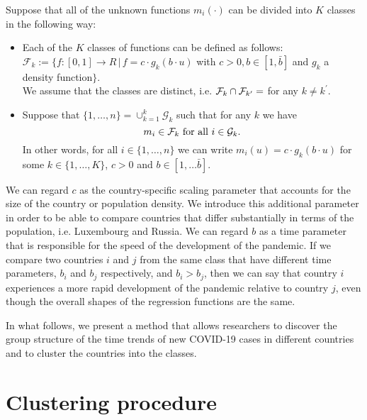 \documentclass[a4paper,11pt]{article}
\numberwithin{equation}{section}
\begin{document}
Suppose that all of the unknown functions $m_i(\cdot)$ can be divided into $K$ classes in the following way:
\begin{itemize}
	\item Each of the $K$ classes of functions can be defined as follows:\\
	 $\mathcal{F}_k := \{ f:[0, 1] \rightarrow R \,|\, f = c \cdot g_k(b \cdot u)$ with $c>0, b\in [1, \bar{b}]$ and $g_k$ a density function$\}$.\\
	 We assume that the classes are distinct, i.e. $\class_k \cap \class_{k^\prime} = \empty$ for any $k \neq k^\prime$. 
	 \item Suppose that $\{1, \ldots, n\} = \cup_{k=1}^k \mathcal{G}_k$ such that for any $k$ we have $$m_i \in \mathcal{F}_k \text{ for all } i \in \mathcal{G}_k.$$
	In other words, for all $i \in \{1, \ldots, n\}$ we can write $m_i(u) = c \cdot g_k (b \cdot u)$ for some $k \in \{1, \ldots, K\}$, $c > 0 $ and $b \in [1, \ldots \bar{b}]$.
\end{itemize} 

We can regard $c$ as the country-specific scaling parameter that accounts for the size of the country or population density. We introduce this additional parameter in order to be able to compare countries that differ substantially in terms of the population, i.e. Luxembourg and Russia. We can regard $b$ as a time parameter that is responsible for the speed of the development of the pandemic. If we compare two countries $i$ and $j$ from the same class that have different time parameters, $b_i$ and $b_j$ respectively, and $b_i > b_j$, then we can say that country $i$ experiences a more rapid development of the pandemic relative to country $j$, even though the overall shapes of the regression functions are the same.

In what follows, we present a method that allows researchers to discover the group structure of the time trends of new COVID-19 cases in different countries and to cluster the countries into the classes.


\section{Clustering procedure}
\end{document}
